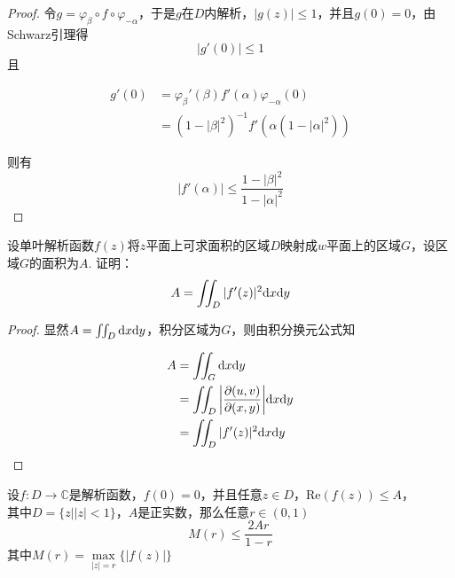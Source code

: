 \begin{proof}
    
    令$g = \varphi_{\beta}\circ f \circ \varphi_{-\alpha}$，于是$g$在$D$内解析，$|g(z)| \leq 1$，并且$g(0) = 0$，由\textup{Schwarz}引理得
    $$|g'(0)| \leq 1$$
    且
    
    \begin{align*}
        g'(0) & = \varphi_{\beta}'(\beta) f'(\alpha) \varphi_{-\alpha}(0) \\
        & =  (1 - |\beta|^2)^{-1}f'(\alpha (1 - |\alpha|^2))
    \end{align*}

    则有
    $$|f'(\alpha)| \leq \dfrac{1 - |\beta|^2}{1 - |\alpha|^2}$$

\end{proof}

\begin{proposition}
    
    设单叶解析函数$f(z)$将$z$平面上可求面积的区域$D$映射成$w$平面上的区域$G$，设区域$G$的面积为$A$. 证明：
    $$ A = \iint_{D}{|f'(z)|^2}\mathrm{d} x\mathrm{d} y$$

\end{proposition}

\begin{proof}
    
    显然$A = \iint_{D}\mathrm{d} x\mathrm{d} y$，积分区域为$G$，则由积分换元公式知

    \begin{align*}
        A & = \iint_{G}\mathrm{d} x\mathrm{d} y \\
          & = \iint_{D}{\left| \dfrac{\partial(u, v)}{\partial(x, y)} \right|}\mathrm{d} x\mathrm{d} y \\
          & = \iint_{D}{|f'(z)|^2}\mathrm{d} x\mathrm{d} y
    \end{align*}

\end{proof}

\begin{proposition}
    
    设$f:D \to \mathbb{C}$是解析函数，$f(0) = 0$，并且任意$z \in D$，$\mathrm{Re}(f(z)) \leq A$，\\
    其中$D = \{z \big| |z| < 1\}$，$A$是正实数，那么任意$r \in (0, 1)$
    $$M(r) \leq \dfrac{2Ar}{1 - r}$$
    其中$M(r) = \max\limits_{|z| = r}\{|f(z)|\}$

\end{proposition}

